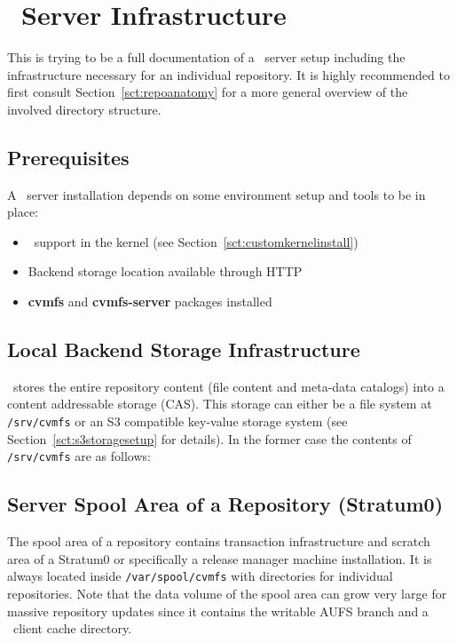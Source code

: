 \chapter{\cvmfs\ Server Infrastructure}
\label{apx:serverinfrastructure}

This is trying to be a full documentation of a \cvmfs\ server setup including the infrastructure necessary for an individual repository.
It is highly recommended to first consult Section~\ref{sct:repoanatomy} for a more general overview of the involved directory structure.

\section{Prerequisites}
A \cvmfs\ server installation depends on some environment setup and tools to be in place:
\begin{itemize}
\item \aufs\ support in the kernel (see Section~\ref{sct:customkernelinstall})
\item Backend storage location available through HTTP
\item \textbf{cvmfs} and \textbf{cvmfs-server} packages installed
\end{itemize}

\section{Local Backend Storage Infrastructure}
\cvmfs\ stores the entire repository content (file content and meta-data catalogs) into a content addressable storage (CAS).
This storage can either be a file system at \texttt{/srv/cvmfs} or an S3 compatible key-value storage system (see Section~\ref{sct:s3storagesetup} for details).
In the former case the contents of \texttt{/srv/cvmfs} are as follows:

\pagebreak

\section{Server Spool Area of a Repository (Stratum0)}
The spool area of a repository contains transaction infrastructure and scratch area of a Stratum0 or specifically a release manager machine installation.
It is always located inside \texttt{/var/spool/cvmfs} with directories for individual repositories.
Note that the data volume of the spool area can grow very large for massive repository updates since it contains the writable AUFS branch and a \cvmfs\ client cache directory.

